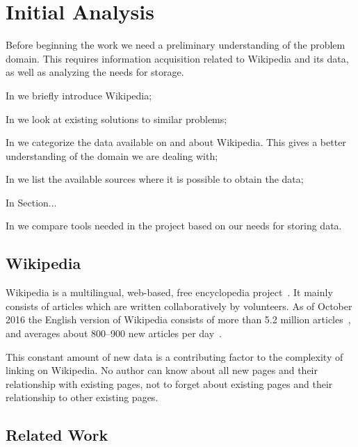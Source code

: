 \chapter{Initial Analysis}\label{chap:analysis}
Before beginning the work we need a preliminary understanding of the problem domain. This requires information acquisition related to Wikipedia and its data, as well as analyzing the needs for storage.

\begin{chapterorganization}
  \item In  we briefly introduce Wikipedia;
  \item In  we look at existing solutions to similar problems;
  \item In  we categorize the data available on and about Wikipedia. This gives a better understanding of the domain we are dealing with;
  \item In  we list the available sources where it is possible to obtain the data;
  \item In Section...
  \item In  we compare tools needed in the project based on our needs for storing data.
\end{chapterorganization}

\section{Wikipedia}\label{sec:about_wikipedia}
Wikipedia is a multilingual, web-based, free encyclopedia project~\cite{wiki-about}. It mainly consists of articles which are written collaboratively by volunteers. As of October 2016 the English version of Wikipedia consists of more than 5.2 million articles~\cite{wiki-about}, and averages about 800--900 new articles per day~\cite{wmcharts}.

This constant amount of new data is a contributing factor to the complexity of linking on Wikipedia. No author can know about all new pages and their relationship with existing pages, not to forget about existing pages and their relationship to other existing pages.

\section{Related Work}\label{sec:related_work}
\dummy

